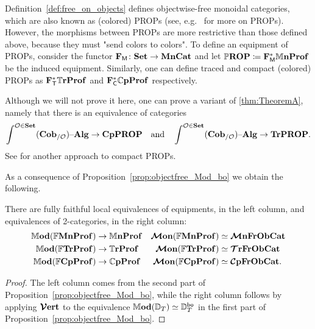\documentclass[11pt,oneside,article]{memoir}
\begin{document}
\begin{remark}
    \label{rem:PROP}
  Definition~\ref{def:free_on_objects} defines objectwise-free monoidal categories, which are also
  known as (colored) PROPs (see, e.g.\ \cite{HackneyRobertson} for more on PROPs). However, the
  morphisms between PROPs are more restrictive than those defined above, because they must "send
  colors to colors". To define an equipment of PROPs, consider the functor $\mathbf{F}_{\mathsf{M}}\colon\mathbf{Set}\to\mathbf{MnCat}$
  and let $\mathbb{P}\mathbf{ROP}\coloneq\mathbf{F}_{\mathsf{M}}^*\mathbb{M}\mathbf{nProf}$ be the induced equipment. Similarly, one can define traced
  and compact (colored) PROPs as $\mathbf{F}_{\mathsf{T}}^*\mathbb{T}\mathbf{rProf}$ and $\mathbf{F}_{\mathsf{C}}^*\mathbb{C}\mathbf{pProf}$ respectively.

  Although we will not prove it here, one can prove a variant of \ref{thm:TheoremA}, namely that
  there is an equivalence of categories
  \begin{equation*}
    \int^{\mathcal{O}\in\mathbf{Set}}(\mathbf{Cob}_{/\mathcal{O}}){\text \textendash}\mathbf{Alg} \to \mathbf{CpPROP}
    \quad\text{and}\quad
    \int^{\mathcal{O}\in\mathbf{Set}}(\mathbf{Cob}_{/\mathcal{O}}){\text \textendash}\mathbf{Alg} \to \mathbf{TrPROP}.
  \end{equation*}
  See \cite{JoyalKock} for another approach to compact PROPs.
\end{remark}

As a consequence of Proposition~\ref{prop:objectfree_Mod_bo} we obtain the following.

\begin{corollary}
    \label{cor:TrCat_ObjectFree}
  There are fully faithful local equivalences of equipments, in the left column, and equivalences of
  2-categories, in the right column:
  \begin{align*}
    \mathbb{M}\mathbf{od}(\mathbb{F}\mathbf{MnProf})  &\to \mathbb{M}\mathbf{nProf} &\bm{\mathcal{M}}\mathbf{on}(\mathbb{F}\mathbf{MnProf})&\simeq\bm{\mathcal{M}}\mathbf{nFrObCat}\\
    \mathbb{M}\mathbf{od}(\mathbb{F}\mathbf{TrProf})   &\to \mathbb{T}\mathbf{rProf}  &\bm{\mathcal{M}}\mathbf{on}(\mathbb{F}\mathbf{TrProf})&\simeq\bm{\mathcal{T}}\mathbf{rFrObCat}\\
    \mathbb{M}\mathbf{od}(\mathbb{F}\mathbf{CpProf}) &\to \mathbb{C}\mathbf{pProf} &\bm{\mathcal{M}}\mathbf{on}(\mathbb{F}\mathbf{CpProf})&\simeq\bm{\mathcal{C}}\mathbf{pFrObCat}.
  \end{align*}
\end{corollary}
\begin{proof}
  The left column comes from the second part of Proposition~\ref{prop:objectfree_Mod_bo}, while the
  right column follows by applying $\bm{\mathcal{V}}\mathbf{ert}$ to the equivalence
  $\mathbb{M}\mathbf{od}(\mathbb{D}_T)\simeq\mathbb{D}_T^{\mathsf{bo}}$ in the first part of
  Proposition~\ref{prop:objectfree_Mod_bo}.
\end{proof}
\end{document}
